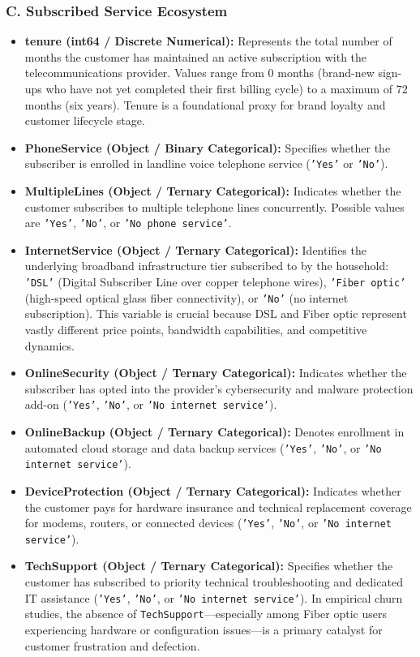 \subsubsection{C. Subscribed Service Ecosystem}
\begin{itemize}
    \item \textbf{tenure (int64 / Discrete Numerical):} Represents the total number of months the customer has maintained an active subscription with the telecommunications provider. Values range from $0$ months (brand-new sign-ups who have not yet completed their first billing cycle) to a maximum of $72$ months (six years). Tenure is a foundational proxy for brand loyalty and customer lifecycle stage.
    \item \textbf{PhoneService (Object / Binary Categorical):} Specifies whether the subscriber is enrolled in landline voice telephone service (\texttt{'Yes'} or \texttt{'No'}).
    \item \textbf{MultipleLines (Object / Ternary Categorical):} Indicates whether the customer subscribes to multiple telephone lines concurrently. Possible values are \texttt{'Yes'}, \texttt{'No'}, or \texttt{'No phone service'}.
    \item \textbf{InternetService (Object / Ternary Categorical):} Identifies the underlying broadband infrastructure tier subscribed to by the household: \texttt{'DSL'} (Digital Subscriber Line over copper telephone wires), \texttt{'Fiber optic'} (high-speed optical glass fiber connectivity), or \texttt{'No'} (no internet subscription). This variable is crucial because DSL and Fiber optic represent vastly different price points, bandwidth capabilities, and competitive dynamics.
    \item \textbf{OnlineSecurity (Object / Ternary Categorical):} Indicates whether the subscriber has opted into the provider's cybersecurity and malware protection add-on (\texttt{'Yes'}, \texttt{'No'}, or \texttt{'No internet service'}).
    \item \textbf{OnlineBackup (Object / Ternary Categorical):} Denotes enrollment in automated cloud storage and data backup services (\texttt{'Yes'}, \texttt{'No'}, or \texttt{'No internet service'}).
    \item \textbf{DeviceProtection (Object / Ternary Categorical):} Indicates whether the customer pays for hardware insurance and technical replacement coverage for modems, routers, or connected devices (\texttt{'Yes'}, \texttt{'No'}, or \texttt{'No internet service'}).
    \item \textbf{TechSupport (Object / Ternary Categorical):} Specifies whether the customer has subscribed to priority technical troubleshooting and dedicated IT assistance (\texttt{'Yes'}, \texttt{'No'}, or \texttt{'No internet service'}). In empirical churn studies, the absence of \texttt{TechSupport}---especially among Fiber optic users experiencing hardware or configuration issues---is a primary catalyst for customer frustration and defection.

\end{itemize}

